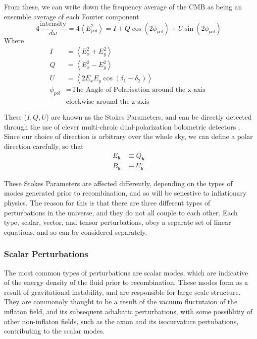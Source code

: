 From these, we can write down the frequency average of the CMB as being an ensemble average of each Fourier component
$$ 4 \frac{\text{intensity}}{d \omega} = 4 \left< E_{pol}^2 \right> =  I + Q \cos(2 \phi_{pol}) + U \sin(2 \phi_{pol}) $$
Where 
\begin{align*}
I &= \left< E_x^2 + E_y^2 \right> \\
Q &= \left< E_x^2 - E_y^2 \right> \\
U &= \left<2 E_x E_y \cos(\delta_1 - \delta_2) \right> \\
\phi_{pol} &= \text{The Angle of Polarisation around the x-axis }\\
& \text{clockwise around the z-axis}
\end{align*}

These ($I,Q,U$) are known as the Stokes Parameters, and can be directly detected through the use of clever multi-chroic dual-polarization bolometric detectors \cite{1210.8256}. Since our choice of direction is arbitrary over the whole sky, we can define a polar direction carefully, so that 
\begin{align*}
E_\textbf{k} &\equiv Q_\textbf{k} \\
B_\textbf{k} &\equiv U_\textbf{k}
\end{align*}


\par These Stokes Parameters are affected differently, depending on the types of modes generated prior to recombination, and so will be senestive to inflationary physics. The reason for this is that there are three different types of perturbations in the universe, and they do not all couple to each other. Each type, scalar, vector, and tensor perturbations, obey a separate set of linear equations, and so can be considered separately. 

\subsubsection{Scalar Perturbations}
The most common types of perturbations are scalar modes, which are indicative of the energy density of the fluid prior to recombination. These modes form as a result of gravitational instability, and are responsible for large scale structure. They are commonoly thought to be a result of the vacuum fluctutaion of the inflaton field, and its subsequent adiabatic perturbations, with some possiblitiy of other non-inflaton fields, such as the axion and its isocurvature pertubations, contributing to the scalar modes. 

